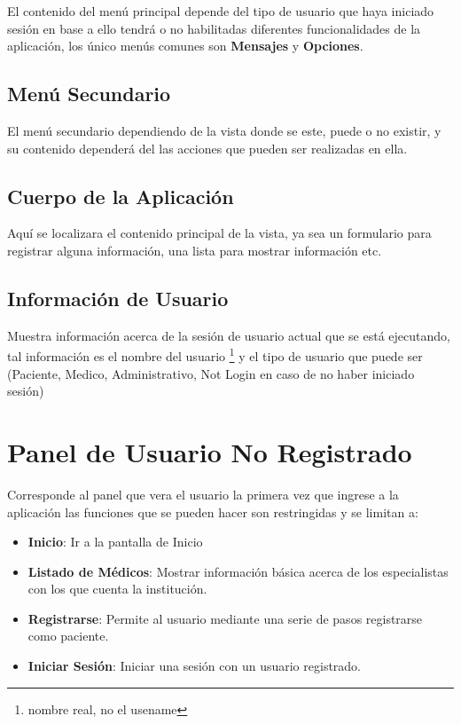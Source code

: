 El contenido del menú principal depende del tipo de usuario que haya iniciado sesión en base a ello tendrá o no habilitadas diferentes funcionalidades de la aplicación, los único menús comunes son \textbf{Mensajes} y \textbf{Opciones}.


\subsection{Menú Secundario}

El menú secundario dependiendo de la vista donde se este, puede o no existir, y su contenido dependerá del las acciones que pueden ser realizadas en ella.


\subsection{Cuerpo de la Aplicación}

Aquí se localizara el contenido principal de la vista, ya sea un formulario para registrar alguna información, una lista para mostrar información etc.


\subsection{Información de Usuario}

Muestra información acerca de la sesión de usuario actual que se está ejecutando, tal información es el nombre del usuario \footnote{nombre real, no el usename} y el tipo de usuario que puede ser (Paciente, Medico, Administrativo, Not Login en caso de no haber
iniciado sesión)


\section{Panel de Usuario No Registrado}

Corresponde al panel que vera el usuario la primera vez que ingrese a la aplicación las funciones que se pueden hacer son restringidas y se limitan a:

\begin{itemize}
    \item \textbf{Inicio}: Ir a la pantalla de Inicio
    \item \textbf{Listado de Médicos}: Mostrar información básica acerca de los especialistas con los que cuenta la institución.
    \item \textbf{Registrarse}: Permite al usuario mediante una serie de pasos registrarse como paciente.
    \item \textbf{Iniciar Sesión}: Iniciar una sesión con un usuario registrado.
\end{itemize}

